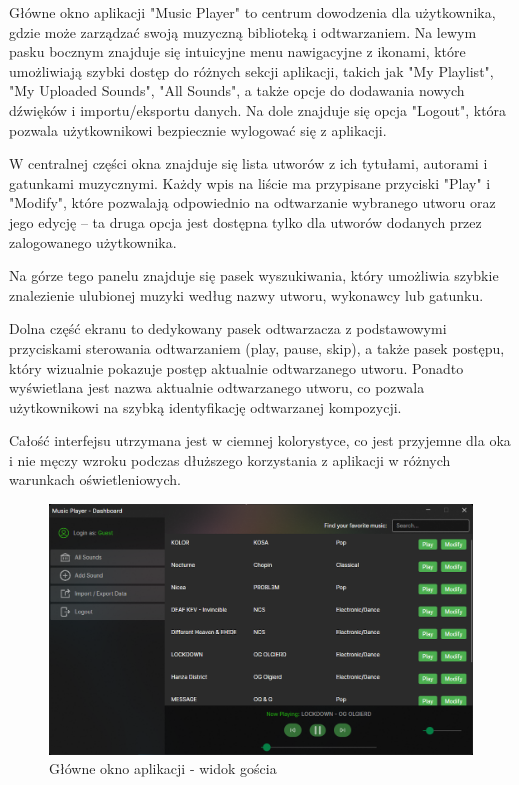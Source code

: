 {
Główne okno aplikacji "Music Player" to centrum dowodzenia dla użytkownika, gdzie może zarządzać swoją muzyczną biblioteką i odtwarzaniem. Na lewym pasku bocznym znajduje się intuicyjne menu nawigacyjne z ikonami, które umożliwiają szybki dostęp do różnych sekcji aplikacji, takich jak "My Playlist", "My Uploaded Sounds", "All Sounds", a także opcje do dodawania nowych dźwięków i importu/eksportu danych. Na dole znajduje się opcja "Logout", która pozwala użytkownikowi bezpiecznie wylogować się z aplikacji.

W centralnej części okna znajduje się lista utworów z ich tytułami, autorami i gatunkami muzycznymi. Każdy wpis na liście ma przypisane przyciski "Play" i "Modify", które pozwalają odpowiednio na odtwarzanie wybranego utworu oraz jego edycję – ta druga opcja jest dostępna tylko dla utworów dodanych przez zalogowanego użytkownika.

Na górze tego panelu znajduje się pasek wyszukiwania, który umożliwia szybkie znalezienie ulubionej muzyki według nazwy utworu, wykonawcy lub gatunku.

Dolna część ekranu to dedykowany pasek odtwarzacza z podstawowymi przyciskami sterowania odtwarzaniem (play, pause, skip), a także pasek postępu, który wizualnie pokazuje postęp aktualnie odtwarzanego utworu. Ponadto wyświetlana jest nazwa aktualnie odtwarzanego utworu, co pozwala użytkownikowi na szybką identyfikację odtwarzanej kompozycji.

Całość interfejsu utrzymana jest w ciemnej kolorystyce, co jest przyjemne dla oka i nie męczy wzroku podczas dłuższego korzystania z aplikacji w różnych warunkach oświetleniowych.

}

\newpage

\begin{figure}[!ht]
	\begin{center}
	\includegraphics[width=500pt]{figures/main_guest.png}
        \caption{{\footnotesize Główne okno aplikacji - widok gościa}}
	\end{center}
\end{figure}

